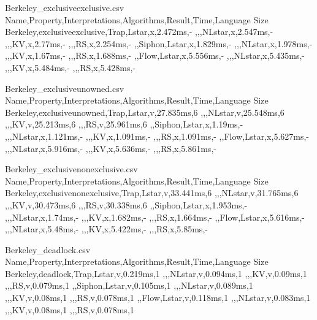 
\begin{filecontents*}{Berkeley_exclusiveexclusive.csv}
	Name,Property,Interpretations,Algorithms,Result,Time,Language Size
	Berkeley,exclusiveexclusive,Trap,Lstar,x,2.472ms,-
	,,,NLstar,x,2.547ms,-
	,,,KV,x,2.77ms,-
	,,,RS,x,2.254ms,-
	,,Siphon,Lstar,x,1.829ms,-
	,,,NLstar,x,1.978ms,-
	,,,KV,x,1.67ms,-
	,,,RS,x,1.688ms,-
	,,Flow,Lstar,x,5.556ms,-
	,,,NLstar,x,5.435ms,-
	,,,KV,x,5.484ms,-
	,,,RS,x,5.428ms,-
\end{filecontents*}

\begin{filecontents*}{Berkeley_exclusiveunowned.csv}
	Name,Property,Interpretations,Algorithms,Result,Time,Language Size
	Berkeley,exclusiveunowned,Trap,Lstar,v,27.835ms,6
	,,,NLstar,v,25.548ms,6
	,,,KV,v,25.213ms,6
	,,,RS,v,25.961ms,6
	,,Siphon,Lstar,x,1.19ms,-
	,,,NLstar,x,1.121ms,-
	,,,KV,x,1.091ms,-
	,,,RS,x,1.091ms,-
	,,Flow,Lstar,x,5.627ms,-
	,,,NLstar,x,5.916ms,-
	,,,KV,x,5.636ms,-
	,,,RS,x,5.861ms,-
\end{filecontents*}

\begin{filecontents*}{Berkeley_exclusivenonexclusive.csv}
	Name,Property,Interpretations,Algorithms,Result,Time,Language Size
	Berkeley,exclusivenonexclusive,Trap,Lstar,v,33.441ms,6
	,,,NLstar,v,31.765ms,6
	,,,KV,v,30.473ms,6
	,,,RS,v,30.338ms,6
	,,Siphon,Lstar,x,1.953ms,-
	,,,NLstar,x,1.74ms,-
	,,,KV,x,1.682ms,-
	,,,RS,x,1.664ms,-
	,,Flow,Lstar,x,5.616ms,-
	,,,NLstar,x,5.48ms,-
	,,,KV,x,5.422ms,-
	,,,RS,x,5.85ms,-
\end{filecontents*}

\begin{filecontents*}{Berkeley_deadlock.csv}
	Name,Property,Interpretations,Algorithms,Result,Time,Language Size
	Berkeley,deadlock,Trap,Lstar,v,0.219ms,1
	,,,NLstar,v,0.094ms,1
	,,,KV,v,0.09ms,1
	,,,RS,v,0.079ms,1
	,,Siphon,Lstar,v,0.105ms,1
	,,,NLstar,v,0.089ms,1
	,,,KV,v,0.08ms,1
	,,,RS,v,0.078ms,1
	,,Flow,Lstar,v,0.118ms,1
	,,,NLstar,v,0.083ms,1
	,,,KV,v,0.08ms,1
	,,,RS,v,0.078ms,1
\end{filecontents*}